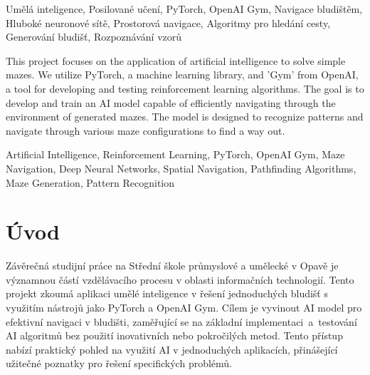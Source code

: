 \documentclass[12pt, a4paper,
twoside,        %
openright
]{report}
\begin{document}

\noindent Umělá inteligence, Posilované učení, PyTorch, OpenAI Gym, Navigace bludištěm, Hluboké neuronové sítě, Prostorová navigace, Algoritmy pro hledání cesty, Generování bludišť, Rozpoznávání vzorů 

\vspace{18pt}


\noindent This project focuses on the application of artificial intelligence to solve simple mazes. We utilize PyTorch, a machine learning library, and 'Gym' from OpenAI, a tool for developing and testing reinforcement learning algorithms. The goal is to develop and train an AI model capable of efficiently navigating through the environment of generated mazes. The model is designed to recognize patterns and navigate through various maze configurations to find a way out.

\vspace{18pt}


\noindent Artificial Intelligence, Reinforcement Learning, PyTorch, OpenAI Gym, Maze Navigation, Deep Neural Networks, Spatial Navigation, Pathfinding Algorithms, Maze Generation, Pattern Recognition 

\clearpage %


\tableofcontents %

\setcounter{page}{1} %

\chapter*{Úvod}
Závěrečná studijní práce na Střední škole průmyslové a umělecké v Opavě je významnou částí vzdělávacího procesu v oblasti informačních technologií. Tento projekt zkoumá aplikaci umělé inteligence v řešení jednoduchých bludišť s využitím nástrojů jako PyTorch a OpenAI Gym. Cílem je vyvinout AI model pro efektivní navigaci v bludišti, zaměřující se na základní \mbox{implementaci a testování} AI algoritmů bez použití inovativních nebo pokročilých metod. Tento přístup nabízí praktický pohled na využití AI v jednoduchých aplikacích, přinášející užitečné poznatky pro řešení specifických problémů.
\end{document}

